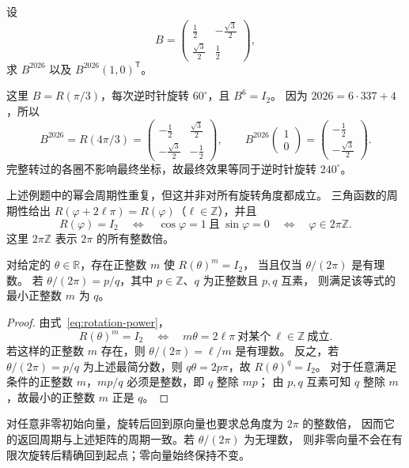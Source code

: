\documentclass[UTF8,12pt,a4paper,fontset=fandol]{ctexart}
\begin{document}
\begin{example}[利用角度计算高次幂]
设
\[
  B=\begin{pmatrix}
    \frac12&-\frac{\sqrt3}{2}\\
    \frac{\sqrt3}{2}&\frac12
  \end{pmatrix},
\]
求 $B^{2026}$ 以及 $B^{2026}(1,0)^{\mathsf T}$。
\end{example}

\begin{solve}
这里 $B=R(\pi/3)$，每次逆时针旋转 $60^\circ$，且 $B^6=I_2$。
因为 $2026=6\cdot337+4$，所以
\[
  B^{2026}=R(4\pi/3)
  =\begin{pmatrix}
    -\frac12&\frac{\sqrt3}{2}\\
    -\frac{\sqrt3}{2}&-\frac12
  \end{pmatrix},\qquad
  B^{2026}\begin{pmatrix}1\\0\end{pmatrix}
  =\begin{pmatrix}-\frac12\\-\frac{\sqrt3}{2}\end{pmatrix}.
\]
完整转过的各圈不影响最终坐标，故最终效果等同于逆时针旋转 $240^\circ$。
\end{solve}

上述例题中的幂会周期性重复，但这并非对所有旋转角度都成立。
三角函数的周期性给出 $R(\varphi+2\ell\pi)=R(\varphi)$（$\ell\in\mathbb Z$），并且
\[
  R(\varphi)=I_2
  \quad\Longleftrightarrow\quad
  \cos\varphi=1\ \text{且}\ \sin\varphi=0
  \quad\Longleftrightarrow\quad
  \varphi\in2\pi\mathbb Z.
\]
这里 $2\pi\mathbb Z$ 表示 $2\pi$ 的所有整数倍。

\begin{proposition}[何时经过有限次旋转回到恒等变换]
对给定的 $\theta\in\mathbb R$，存在正整数 $m$ 使 $R(\theta)^m=I_2$，
当且仅当 $\theta/(2\pi)$ 是有理数。
若 $\theta/(2\pi)=p/q$，其中 $p\in\mathbb Z$、$q$ 为正整数且 $p,q$ 互素，
则满足该等式的最小正整数 $m$ 为 $q$。
\end{proposition}

\begin{proof}
由式~\eqref{eq:rotation-power}，
\[
  R(\theta)^m=I_2
  \quad\Longleftrightarrow\quad
  m\theta=2\ell\pi\ \text{对某个}\ \ell\in\mathbb Z\ \text{成立}.
\]
若这样的正整数 $m$ 存在，则 $\theta/(2\pi)=\ell/m$ 是有理数。
反之，若 $\theta/(2\pi)=p/q$ 为上述最简分数，则 $q\theta=2p\pi$，故 $R(\theta)^q=I_2$。
对于任意满足条件的正整数 $m$，$mp/q$ 必须是整数，即 $q$ 整除 $mp$；
由 $p,q$ 互素可知 $q$ 整除 $m$，故最小的正整数 $m$ 正是 $q$。
\end{proof}

对任意非零初始向量，旋转后回到原向量也要求总角度为 $2\pi$ 的整数倍，
因而它的返回周期与上述矩阵的周期一致。若 $\theta/(2\pi)$ 为无理数，
则非零向量不会在有限次旋转后精确回到起点；零向量始终保持不变。
\end{document}
